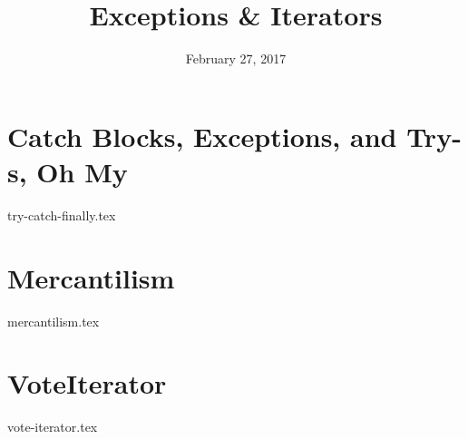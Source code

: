 \documentclass[11pt]{exam}
\title{Exceptions \& Iterators}
\date{February 27, 2017}
\begin{document}
\maketitle

\section{Catch Blocks, Exceptions, and Try-s, Oh My}
\begin{questions}
{try-catch-finally.tex}
\end{questions}

\clearpage

\section{Mercantilism}
\begin{questions}
{mercantilism.tex}
\end{questions}

\clearpage

\section{VoteIterator}
\begin{questions}
{vote-iterator.tex}
\end{questions}
\end{document}

